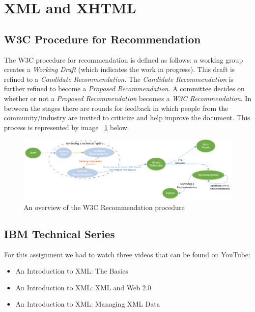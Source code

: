 
\section{XML and XHTML}
\label{sect:cedric}
\subsection{W3C Procedure for Recommendation}

The W3C procedure for recommendation is defined as follows: a working group creates a \textit{Working Draft} (which indicates the work in progress). This draft is refined to a \textit{Candidate Recommendation}. The \textit{Candidate Recommendation} is further refined to become a \textit{Proposed Recommendation}. A committee decides on whether or not a \textit{Proposed Recommendation} becomes a \textit{W3C Recommendation}. In between the stages there are rounds for feedback in which people from the community/industry are invited to criticize and help improve the document. This process is represented by image ~\ref{fig:RecommendationProcedure} below.

\vspace{10pt}

\begin{figure}[here]
	\centering
	\includegraphics[width=1.0\textwidth]{images/w3c.png}
	\caption{An overview of the W3C Recommendation procedure}
	\label{fig:RecommendationProcedure}
\end{figure}

\subsection{IBM Technical Series}

For this assignment we had to watch three videos that can be found on YouTube:
\begin{itemize}
\item An Introduction to XML: The Basics \citep{ibmtechnicalpart1}
\item An Introduction to XML: XML and Web 2.0 \citep{ibmtechnicalpart2}
\item An Introduction to XML: Managing XML Data \citep{ibmtechnicalpart3}
\end{itemize}


